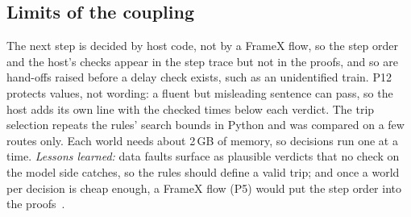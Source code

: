 
\subsection{Limits of the coupling}

The next step is decided by host code, not by a FrameX flow, so the step order and the host's checks appear in the step trace but not in the proofs, and so are hand-offs raised before a delay check exists, such as an unidentified train. P12 protects values, not wording: a fluent but misleading sentence can pass, so the host adds its own line with the checked times below each verdict. The trip selection repeats the rules' search bounds in Python and was compared on a few routes only. Each world needs about 2\,GB of memory, so decisions run one at a time. \emph{Lessons learned:} data faults surface as plausible verdicts that no check on the model side catches, so the rules should define a valid trip; and once a world per decision is cheap enough, a FrameX flow (P5) would put the step order into the proofs~\citep{rechsteiner2026adr0001,rechsteiner2026adr0002}.
